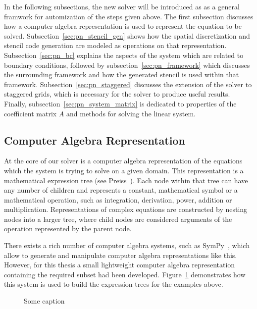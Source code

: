In the following subsections, the new solver will be introduced as as a general framwork for automization of the steps given above. The first subsection discusses how a computer algebra representation is used to represent the equation to be solved. Subsection~\ref{sec:pn_stencil_gen} shows how the spatial discretization and stencil code generation are modeled as operations on that representation. Subsection~\ref{sec:pn_bc} explains the aspects of the system which are related to boundary conditions, followed by subsection~\ref{sec:pn_framework} which discusses the surrounding framework and how the generated stencil is used within that framework. Subsection~\ref{sec:pn_staggered} discusses the extension of the solver to staggered grids, which is necessary for the solver to produce useful results. Finally, subsection~\ref{sec:pn_system_matrix} is dedicated to properties of the coefficient matrix $A$ and methods for solving the linear system.

\subsection{Computer Algebra Representation}
\label{sec:pn_car}

At the core of our solver is a computer algebra representation of the equations which the system is trying to solve on a given domain. This representation is a mathematical expression tree (see Preiss~\cite{Preiss00}). Each node within that tree can have any number of children and represents a constant, mathematical symbol or a mathematical operation, such as integration, derivation, power, addition or multiplication. Representations of complex equations are constructed by nesting nodes into a larger tree, where child nodes are considered arguments of the operation represented by the parent node.

There exists a rich number of computer algebra systems, such as SymPy~\cite{Meurer17}, which allow to generate and manipulate computer algebra representations like this. However, for this thesis a small lightweight computer algebra representation containing the required subset had been developed. Figure~\ref{fig:pn_math_expression_tree_generation} demonstrates how this system is used to build the expression trees for the examples above.
\begin{figure}[h]
\centering
{}
\caption{Some caption}
\label{fig:pn_math_expression_tree_generation}
\end{figure}

